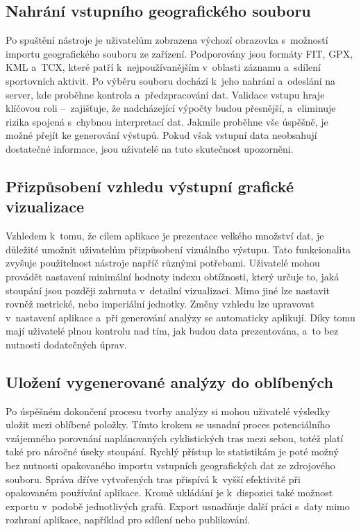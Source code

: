 \subsection{Nahrání vstupního geografického souboru}
\label{uploading-input-geographic-files}

Po spuštění nástroje je uživatelům zobrazena výchozí obrazovka s~možností importu geografického souboru ze zařízení.
Podporovány jsou formáty FIT, GPX, KML a~TCX, které patří k~nejpoužívanějším v~oblasti záznamu a~sdílení sportovních aktivit.
Po výběru souboru dochází k~jeho nahrání a~odeslání na server, kde proběhne kontrola a~předzpracování dat.
Validace vstupu hraje klíčovou roli --~zajišťuje, že nadcházející výpočty budou přesnější, a~eliminuje rizika spojená s~chybnou interpretací dat.
Jakmile proběhne vše úspěšně, je možné přejít ke generování výstupů.
Pokud však vstupní data neobsahují dostatečné informace, jsou uživatelé na tuto skutečnost upozorněni.

\subsection{Přizpůsobení vzhledu výstupní grafické vizualizace}
\label{customizing-the-appearance-of-output-graphic-visualizations}

Vzhledem k~tomu, že cílem aplikace je prezentace velkého množství dat, je důležité umožnit uživatelům přizpůsobení vizuálního výstupu.
Tato funkcionalita zvyšuje použitelnost nástroje napříč různými potřebami.
Uživatelé mohou provádět nastavení minimální hodnoty indexu obtížnosti, který určuje to, jaká stoupání jsou později zahrnuta v~detailní vizualizaci.
Mimo jiné lze nastavit rovněž metrické, nebo imperiální jednotky.
Změny vzhledu lze upravovat v~nastavení aplikace a~při generování analýzy se automaticky aplikují.
Díky tomu mají uživatelé plnou kontrolu nad tím, jak budou data prezentována, a~to bez nutnosti dodatečných úprav.

\subsection{Uložení vygenerované analýzy do oblíbených}
\label{saving-and-exporting-generated-analyses-to-favorites}

Po úspěšném dokončení procesu tvorby analýzy si mohou uživatelé výsledky uložit mezi oblíbené položky.
Tímto krokem se usnadní proces potenciálního vzájemného porovnání naplánovaných cyklistických tras mezi sebou, totéž platí také pro náročné úseky stoupání.
Rychlý přístup ke statistikám je poté možný bez nutnosti opakovaného importu vstupních geografických dat ze zdrojového souboru.
Správa dříve vytvořených tras přispívá k~vyšší efektivitě při opakovaném používání aplikace.
Kromě ukládání je k~dispozici také možnost exportu v~podobě jednotlivých grafů.
Export usnadňuje další práci s~daty mimo rozhraní aplikace, například pro sdílení nebo publikování.

